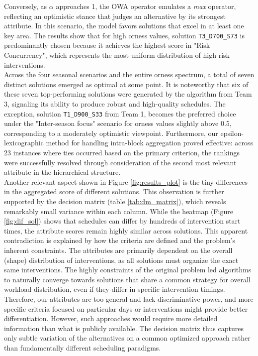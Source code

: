 Conversely, as $\alpha$ approaches 1, the OWA operator emulates a \textit{max} operator, reflecting an optimistic stance that judges an alternative by its strongest attribute. In this scenario, the model favors solutions that excel in at least one key area. The results show that for high orness values, solution \texttt{T3\_D700\_S73} is predominantly chosen because it achieves the highest score in "Risk Concurrency", which represents the most uniform distribution of high-risk interventions.\\

Across the four seasonal scenarios and the entire orness spectrum, a total of seven distinct solutions emerged as optimal at some point. It is noteworthy that six of these seven top-performing solutions were generated by the algorithm from Team 3, signaling its ability to produce robust and high-quality schedules. The exception, solution \texttt{T1\_D900\_S33} from Team 1, becomes the preferred choice under the "Inter-season focus" scenario for orness values slightly above 0.5, corresponding to a moderately optimistic viewpoint. Furthermore, our epsilon-lexicographic method for handling intra-block aggregation proved effective: across 23 instances where ties occurred based on the primary criterion, the rankings were successfully resolved through consideration of the second most relevant attribute in the hierarchical structure.\\

Another relevant aspect shown in Figure \ref{fig:results_plot} is the tiny differences in the aggregated score of different solutions. This observation is further supported by the decision matrix (table \ref{tab:dm_matrix}), which reveals remarkably small variance within each column. While the heatmap (Figure \ref{fig:dif_sol}) shows that schedules can differ by hundreds of intervention start times, the attribute scores remain highly similar across solutions. This apparent contradiction is explained by how the criteria are defined and the problem's inherent constraints. The attributes are primarily dependent on the overall (shape) distribution of interventions, as all solutions must organize the exact same interventions. The highly constraints of the original problem led algorithms to naturally converge towards solutions that share a common strategy for overall workload distribution, even if they differ in specific intervention timings. Therefore, our attributes are too general and lack discriminative power, and more specific criteria focused on particular days or interventions might provide better differentiation. However, such approaches would require more detailed information than what is publicly available. The decision matrix thus captures only subtle variation of the alternatives on a common optimized approach rather than fundamentally different scheduling paradigms. \\

